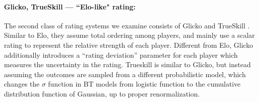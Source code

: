 \paragraph{Glicko, TrueSkill --- ``Elo-like" rating:} The second class of rating systems we examine consists of Glicko \citep{glickman1995glicko} and TrueSkill \citep{dangauthier2007trueskill}. Similar to Elo, they assume total ordering among players, and mainly use a scalar rating to represent the relative strength of each player. Different from Elo, Glicko additionally introduces a ``rating deviation'' parameter for each player which measures the uncertainty in the rating. Trueskill is similar to Glicko, but instead assuming the outcomes are sampled from a different probabilistic model, which changes the $\sigma$ function in BT models from logistic function to the cumulative distribution function of Gaussian, up to proper renormalization.




